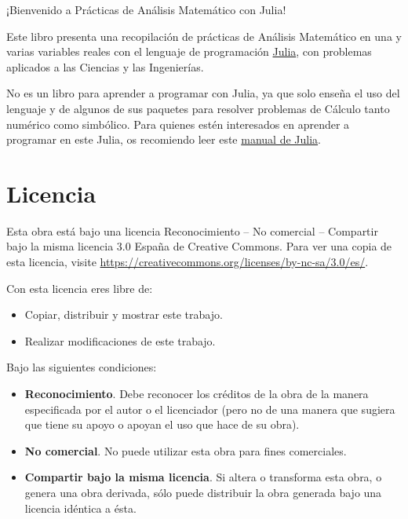 \documentclass[
  a4paper,
]{scrreport}
\providecommand{\tightlist}{%
  \setlength{\itemsep}{0pt}\setlength{\parskip}{0pt}}\usepackage{longtable,booktabs,array}
\theoremstyle{definition}
\theoremstyle{remark}
\begin{document}

¡Bienvenido a Prácticas de Análisis Matemático con Julia!

Este libro presenta una recopilación de prácticas de Análisis Matemático
en una y varias variables reales con el lenguaje de programación
\href{https://julialang.org/}{Julia}, con problemas aplicados a las
Ciencias y las Ingenierías.

No es un libro para aprender a programar con Julia, ya que solo enseña
el uso del lenguaje y de algunos de sus paquetes para resolver problemas
de Cálculo tanto numérico como simbólico. Para quienes estén interesados
en aprender a programar en este Julia, os recomiendo leer este
\href{https://aprendeconalf.es/manual-julia/}{manual de Julia}.

\section*{Licencia}\label{licencia}


Esta obra está bajo una licencia Reconocimiento -- No comercial --
Compartir bajo la misma licencia 3.0 España de Creative Commons. Para
ver una copia de esta licencia, visite
\url{https://creativecommons.org/licenses/by-nc-sa/3.0/es/}.

Con esta licencia eres libre de:

\begin{itemize}
\tightlist
\item
  Copiar, distribuir y mostrar este trabajo.
\item
  Realizar modificaciones de este trabajo.
\end{itemize}

Bajo las siguientes condiciones:

\begin{itemize}
\item
  \textbf{Reconocimiento}. Debe reconocer los créditos de la obra de la
  manera especificada por el autor o el licenciador (pero no de una
  manera que sugiera que tiene su apoyo o apoyan el uso que hace de su
  obra).
\item
  \textbf{No comercial}. No puede utilizar esta obra para fines
  comerciales.
\item
  \textbf{Compartir bajo la misma licencia}. Si altera o transforma esta
  obra, o genera una obra derivada, sólo puede distribuir la obra
  generada bajo una licencia idéntica a ésta.
\end{itemize}
\end{document}
